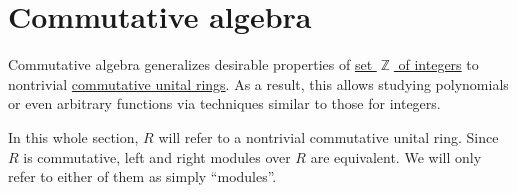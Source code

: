 \section{Commutative algebra}\label{sec:commutative_algebra}

Commutative algebra generalizes desirable properties of \hyperref[def:set_of_integers]{set \( \BbbZ \) of integers} to nontrivial \hyperref[def:ring/commutative]{commutative unital rings}. As a result, this allows studying polynomials or even arbitrary functions via techniques similar to those for integers.

In this whole section, \( R \) will refer to a nontrivial commutative unital ring. Since \( R \) is commutative, left and right modules over \( R \) are equivalent. We will only refer to either of them as simply \enquote{modules}.
